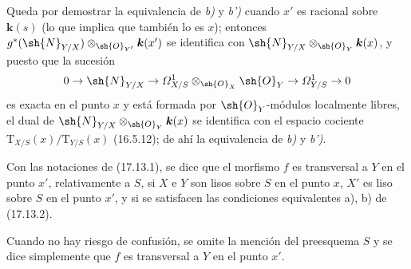 Queda por demostrar la equivalencia de \emph{b)} y \emph{b')} cuando $x'$ es racional sobre $\boldsymbol k(s)$ (lo que implica que también lo es $x$); entonces $g^*(\sh{N}_{Y/X})\otimes_{\sh{O}_{Y'}}\boldsymbol k(x')$ se identifica con $\sh{N}_{Y/X}\otimes_{\sh{O}_Y}\boldsymbol k(x)$, y puesto que la sucesión
\[
0\to\sh{N}_{Y/X}\to\varOmega^1_{X/S}\otimes_{\sh{O}_X}\sh{O}_Y\to\varOmega^1_{Y/S}\to0
\]
es exacta en el punto $x$ y está formada por $\sh{O}_Y$-módulos localmente libres, el dual de $\sh{N}_{Y/X}\otimes_{\sh{O}_Y}\boldsymbol k(x)$ se identifica con el espacio cociente $\mathrm{T}_{X/S}(x)/\mathrm{T}_{Y/S}(x)$ (16.5.12); de ahí la equivalencia de \emph{b)} y \emph{b')}.

\begin{definition}[17.13.3]
\label{IV.17.13.3}
Con las notaciones de \textup{(17.13.1)}, se dice que el morfismo $f$ es transversal a $Y$ en el punto $x'$, relativamente a $S$, si $X$ e $Y$ son lisos sobre $S$ en el punto $x$, $X'$ es liso sobre $S$ en el punto $x'$, y si se satisfacen las condiciones equivalentes \textup{a), b)} de \textup{(17.13.2)}.
\end{definition}

Cuando no hay riesgo de confusión, se omite la mención del preesquema $S$ y se dice simplemente que $f$ es transversal a $Y$ en el punto $x'$.

